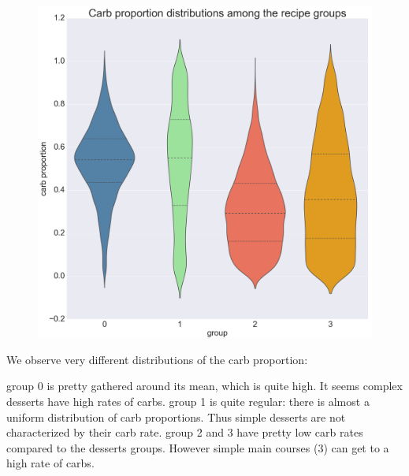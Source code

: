 \documentclass[11pt]{article}
\begin{document}
\begin{figure}[!h]
	\includegraphics[width=\columnwidth]{../carb_prop_distrib-r.png}
	\caption{}
	\label{fig:2}
\end{figure}

We observe very different distributions of the carb proportion:

group 0 is pretty gathered around its mean, which is quite high. It seems complex desserts have high rates of carbs.
group 1 is quite regular: there is almost a uniform distribution of carb proportions. Thus simple desserts are not characterized by their carb rate.
group 2 and 3 have pretty low carb rates compared to the desserts groups. However simple main courses (3) can get to a high rate of carbs.
\end{document}
